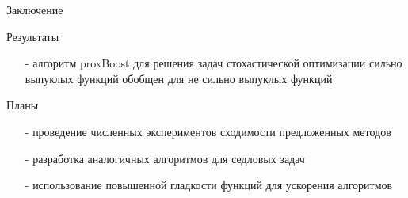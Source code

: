 \documentclass{beamer}
\begin{document}
\begin{frame}{Заключение}
     \begin{block}{Результаты}
     \begin{itemize}
         \item[-] алгоритм proxBoost для решения задач стохастической оптимизации сильно выпуклых функций обобщен для не сильно выпуклых функций

     \end{itemize}
     \end{block}
     \begin{block}{Планы}
     \begin{itemize}
         \item[-] проведение численных экспериментов сходимости предложенных методов
         \item[-] разработка аналогичных алгоритмов для седловых задач
         \item[-] использование повышенной гладкости функций для ускорения алгоритмов
     \end{itemize}
     \end{block}
 \end{frame}
\end{document}
